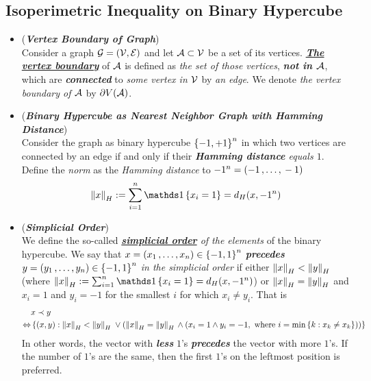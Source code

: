 \documentclass[11pt]{article}
\begin{document}
\subsection{Isoperimetric Inequality on Binary Hypercube}
\begin{itemize}
\item \begin{definition} (\emph{\textbf{Vertex Boundary of Graph}}) \citep{boucheron2013concentration}\\
Consider a graph ${\mathcal G} = ({\mathcal V}, {\mathcal E})$ and let ${\mathcal A} \subset {\mathcal V}$ be a set of its vertices. \underline{\emph{\textbf{The vertex boundary}}} of ${\mathcal A}$ is defined as \emph{the set of those vertices}, \emph{\textbf{not in ${\mathcal A}$}}, which are \emph{\textbf{connected}} to \emph{some vertex in ${\mathcal V}$} by \emph{an edge}. We denote \emph{the vertex boundary of ${\mathcal A}$} by $\partial V({\mathcal A})$.
\end{definition}

\item \begin{remark} (\textbf{\emph{Binary Hypercube as Nearest Neighbor Graph with Hamming Distance}}) \\
Consider the graph as binary hypercube $\left\{-1, +1\right\}^n$ in which two vertices are connected by an edge if and only if their \emph{\textbf{Hamming distance} equals $1$}.  Define the \emph{norm} as the \emph{Hamming distance} to $-1^n= (-1 \,{,}\ldots{,}\, -1)$
\begin{align*}
\norm{x}{H} := \sum_{i=1}^{n}\ind{x_i = 1} = d_{H}(x, -1^n)
\end{align*}
\end{remark}

\item \begin{definition} (\textbf{\emph{Simplicial Order}})\\
We define the so-called \emph{\underline{\textbf{simplicial order}} of the elements} of the binary hypercube. We say that $x = (x_1 \,{,}\ldots{,}\, x_n) \in \left\{-1, 1\right\}^n$ \emph{\textbf{precedes}} $y = (y_1 \,{,}\ldots{,}\, y_n) \in \left\{-1, 1\right\}^n$  \emph{in the simplicial order} if either $\left\|x\right\|_{H} < \left\|y\right\|_{H}$ (where $\norm{x}{H} := \sum_{i=1}^{n}\ind{x_i = 1} = d_{H}(x, -1^n)$) or $\left\|x\right\|_{H} = \left\|y\right\|_{H}$ and $x_i = 1$ and $y_i = -1$ for the smallest $i$ for which $x_i \neq y_i$.  That is
\begin{align*}
&x \prec y \\
\Leftrightarrow &\left\{(x,y): \left\|x\right\|_{H} < \left\|y\right\|_{H} \; \lor (\left\|x\right\|_{H} = \left\|y\right\|_{H} \, \land (x_i =1 \land y_i = -1, \text{ where }i=\min\left\{k: x_k \neq x_k\right\} )) \right\}
\end{align*} In other words, the vector with \emph{\textbf{less}} $1$'s \emph{\textbf{precedes}} the vector with more $1$'s. If the number of $1$'s are the same, then the first $1$'s on the leftmost position is preferred.
\end{definition} 


\end{itemize}
\end{document}
